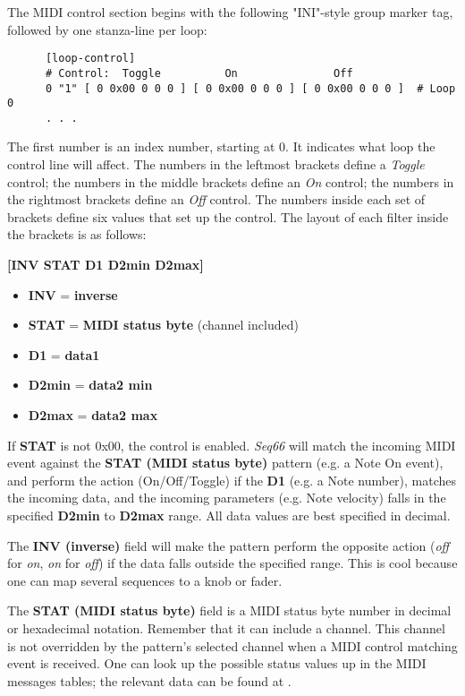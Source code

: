    The MIDI control section begins with the following "INI"-style
   group marker tag, followed by one stanza-line per loop:

   \begin{verbatim}
      [loop-control]
      # Control:  Toggle          On               Off
      0 "1" [ 0 0x00 0 0 0 ] [ 0 0x00 0 0 0 ] [ 0 0x00 0 0 0 ]  # Loop 0
      . . .
   \end{verbatim}

   The first number is an index number, starting at 0.  It indicates what
   loop the control line will affect.
   The numbers in the leftmost brackets define a \textsl{Toggle} control;
   the numbers in the middle brackets define an \textsl{On} control;
   the numbers in the rightmost brackets define an \textsl{Off} control.
   The numbers inside each set of brackets define six values that set up the
   control.  The layout of each filter inside the brackets is as follows:

      \textbf{[INV STAT D1 D2min D2max]}

   \begin{itemize}
      \item \textbf{INV} = \textbf{inverse}
      \item \textbf{STAT} = \textbf{MIDI status byte} (channel included) 
      \item \textbf{D1} = \textbf{data1}
      \item \textbf{D2min} = \textbf{data2 min}
      \item \textbf{D2max} = \textbf{data2 max}
   \end{itemize}

   If \textbf{STAT} is not 0x00, the control is enabled.  \textsl{Seq66} will
   match the incoming MIDI event against the \textbf{STAT (MIDI status byte)}
   pattern (e.g. a Note On event), and perform the action (On/Off/Toggle) if
   the \textbf{D1} (e.g. a Note number), matches the incoming data, and the
   incoming parameters (e.g. Note velocity) falls in the specified
   \textbf{D2min} to \textbf{D2max} range.  All data values are best specified
   in decimal.

   The \textbf{INV (inverse)} field will make the pattern perform the opposite
   action (\textsl{off} for \textsl{on}, \textsl{on} for \textsl{off}) if the
   data falls outside the specified range.  This is cool because one can map
   several sequences to a knob or fader.

   The \textbf{STAT (MIDI status byte)} field is a MIDI status byte number in
   decimal or hexadecimal notation.
   Remember that it can include a channel.  This channel is not overridden by
   the pattern's selected channel when a MIDI control matching event is
   received. 
   One can look up the possible status values up in the MIDI messages tables;
   the relevant data can be found at \cite{midicontroltable}.

